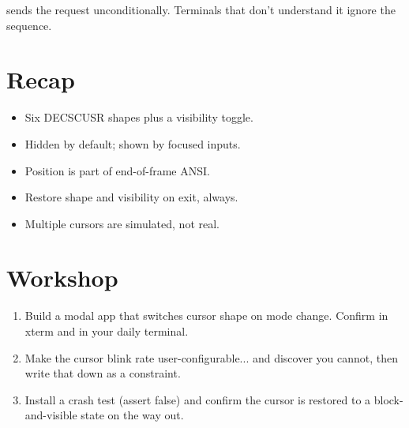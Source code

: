 \maya{} sends the request unconditionally. Terminals that
don't understand it ignore the sequence.

\section{Recap}

\begin{recap}
\begin{itemize}[leftmargin=*]
  \item Six DECSCUSR shapes plus a visibility toggle.
  \item Hidden by default; shown by focused inputs.
  \item Position is part of end-of-frame ANSI.
  \item Restore shape and visibility on exit, always.
  \item Multiple cursors are simulated, not real.
\end{itemize}
\end{recap}

\section*{Workshop}

\begin{enumerate}[leftmargin=*]
  \item Build a modal app that switches cursor shape on
    mode change. Confirm in xterm and in your daily
    terminal.
  \item Make the cursor blink rate user-configurable... and
    discover you cannot, then write that down as a
    constraint.
  \item Install a crash test (assert false) and confirm the
    cursor is restored to a block-and-visible state on the
    way out.
\end{enumerate}
